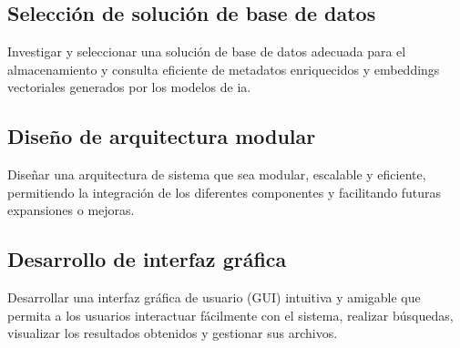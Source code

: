 \subsection{Selección de solución de base de datos}
Investigar y seleccionar una solución de base de datos adecuada para el almacenamiento y consulta eficiente de metadatos enriquecidos y embeddings vectoriales generados por los modelos de \gls{ia}.
\subsection{Diseño de arquitectura modular}
Diseñar una arquitectura de sistema que sea modular, escalable y eficiente, permitiendo la integración de los diferentes componentes y facilitando futuras expansiones o mejoras.
\subsection{Desarrollo de interfaz gráfica}
Desarrollar una interfaz gráfica de usuario (GUI) intuitiva y amigable que permita a los usuarios interactuar fácilmente con el sistema, realizar búsquedas, visualizar los resultados obtenidos y gestionar sus archivos.
